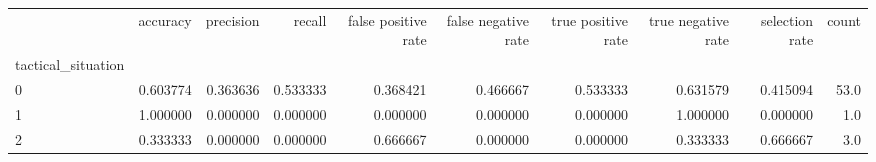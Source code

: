 \begin{tabular}{lrrrrrrrrr}
\toprule
{} &  accuracy &  precision &    recall &  false positive rate &  false negative rate &  true positive rate &  true negative rate &  selection rate &  count \\
tactical\_situation &           &            &           &                      &                      &                     &                     &                 &        \\
\midrule
0                  &  0.603774 &   0.363636 &  0.533333 &             0.368421 &             0.466667 &            0.533333 &            0.631579 &        0.415094 &   53.0 \\
1                  &  1.000000 &   0.000000 &  0.000000 &             0.000000 &             0.000000 &            0.000000 &            1.000000 &        0.000000 &    1.0 \\
2                  &  0.333333 &   0.000000 &  0.000000 &             0.666667 &             0.000000 &            0.000000 &            0.333333 &        0.666667 &    3.0 \\
\bottomrule
\end{tabular}
